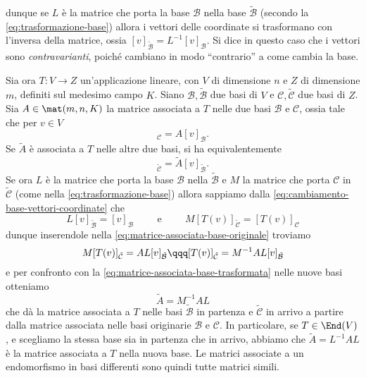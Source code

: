 dunque se $L$ è la matrice che porta la base $\mathcal B$ nella base $\tilde{\mathcal B}$ (secondo la \eqref{eq:trasformazione-base}) allora i vettori delle coordinate si trasformano con l'inversa della matrice, ossia $[v]_{\tilde{\mathcal B}}=L^{-1}[v]_{\mathcal B}$.
Si dice in questo caso che i vettori sono \emph{contravarianti}, poich\'e cambiano in modo ``contrario'' a come cambia la base.

Sia ora $T\colon V\to Z$ un'applicazione lineare, con $V$ di dimensione $n$ e $Z$ di dimensione $m$, definiti sul medesimo campo $K$.
Siano $\mathcal B,\tilde{\mathcal B}$ due basi di $V$ e $\mathcal C,\tilde{\mathcal C}$ due basi di $Z$.
Sia $A\in\mat(m,n,K)$ la matrice associata a $T$ nelle due basi $\mathcal B$ e $\mathcal C$, ossia tale che per $v\in V$
\begin{equation}
	[T(v)]_{\mathcal C}=A[v]_{\mathcal B}.
	\label{eq:matrice-associata-base-originale}
\end{equation}
Se $\tilde A$ è associata a $T$ nelle altre due basi, si ha equivalentemente
\begin{equation}
	[T(v)]_{\tilde{\mathcal C}}=\tilde A[v]_{\tilde{\mathcal B}}.
	\label{eq:matrice-associata-base-trasformata}
\end{equation}
Se ora $L$ è la matrice che porta la base $\mathcal B$ nella $\tilde{\mathcal B}$ e $M$ la matrice che porta $\mathcal C$ in $\tilde{\mathcal C}$ (come nella \eqref{eq:trasformazione-base}) allora sappiamo dalla \eqref{eq:cambiamento-base-vettori-coordinate} che
\begin{equation}
	L[v]_{\tilde{\mathcal B}}=[v]_{\mathcal B}
	\hspace{1cm}\text{e}\hspace{1cm}
	M[T(v)]_{\tilde{\mathcal C}}=[T(v)]_{\mathcal C}
\end{equation}
dunque inserendole nella \eqref{eq:matrice-associata-base-originale} troviamo
\begin{equation}
	M[T(v)]_{\tilde{\mathcal C}}=AL[v]_{\tilde{\mathcal B}}
	\qqq
	[T(v)]_{\tilde{\mathcal C}}=M^{-1}AL[v]_{\tilde{\mathcal B}}
\end{equation}
e per confronto con la \eqref{eq:matrice-associata-base-trasformata} nelle nuove basi otteniamo
\begin{equation}
	\tilde A=M^{-1}AL
	\label{eq:trasformazione-matrice-associata}
\end{equation}
che dà la matrice associata a $T$ nelle basi $\tilde{\mathcal B}$ in partenza e $\tilde{\mathcal C}$ in arrivo a partire dalla matrice associata nelle basi originarie $\mathcal B$ e $\mathcal C$.
In particolare, se $T\in\End(V)$, e scegliamo la stessa base sia in partenza che in arrivo, abbiamo che $\tilde A=L^{-1}AL$ è la matrice associata a $T$ nella nuova base.
Le matrici associate a un endomorfismo in basi differenti sono quindi tutte matrici simili.

